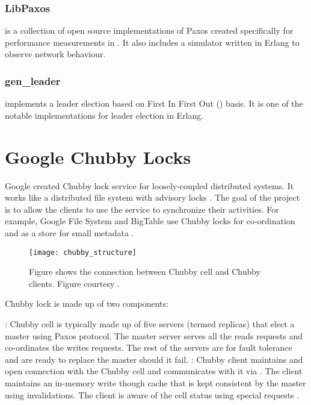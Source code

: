 \subsubsection{LibPaxos}

\citet{Lugano2012} is a collection of open source
implementations of Paxos created specifically for performance measurements
in \citet{MarandiPSP10}. It also includes a simulator written in Erlang to
observe network behaviour.

\subsubsection{gen\_leader}

\citet{Ulf2012} implements a leader election based on First In
First Out () basis. It is one of the notable implementations for
leader election in Erlang.

\section{Google Chubby Locks}
\label{section:chubby.locks}

Google created Chubby lock service \citep{Burrows06} for loosely-coupled
distributed systems. It works like a distributed file system with advisory
locks%
. The goal of the project is to allow the clients to use the service
to synchronize their activities. For example, Google File System \citep{gfs}
and BigTable \citep{ChangDGHWBCFG06} use Chubby locks for co-ordination and
as a store for small metadata \citep{ChandraGR07}.

\begin{figure}
  \texttt{[image: chubby\_structure]}
  \caption[Chubby structure]{%
    Figure shows the connection between Chubby cell and Chubby clients.
    Figure courtesy \citet{Burrows06}.}
  \label{figure:chubby.structure}
\end{figure}

Chubby lock is made up of two components:

\begin{itemize}
    : Chubby cell is typically made up of five servers
    (termed replicas) that elect a master using Paxos protocol. The master
    server serves all the reads requests and co-ordinates the writes requests.
    The rest of the servers are for fault tolerance and are ready to replace the
    master should it fail.
    : Chubby client maintains and open connection with
    the Chubby cell and communicates with it via %
    . The client maintains an in-memory write though cache that
    is kept consistent by the master using invalidations. The client is
    aware of the cell status using special requests%
    .
\end{itemize}

